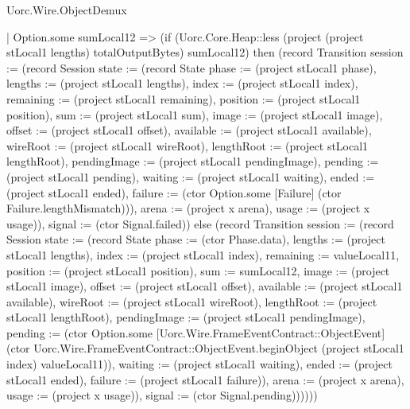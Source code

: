 \begin{lexlean}{Uorc.Wire.ObjectDemux}
\begin{semanticmodule}
{            | Option.some sumLocal12 => (if (Uorc.Core.Heap::less (project (project stLocal1 lengths) totalOutputBytes) sumLocal12) then (record Transition {session := (record Session {state := (record State {phase := (project stLocal1 phase), lengths := (project stLocal1 lengths), index := (project stLocal1 index), remaining := (project stLocal1 remaining), position := (project stLocal1 position), sum := (project stLocal1 sum), image := (project stLocal1 image), offset := (project stLocal1 offset), available := (project stLocal1 available), wireRoot := (project stLocal1 wireRoot), lengthRoot := (project stLocal1 lengthRoot), pendingImage := (project stLocal1 pendingImage), pending := (project stLocal1 pending), waiting := (project stLocal1 waiting), ended := (project stLocal1 ended), failure := (ctor Option.some [Failure] (ctor Failure.lengthMismatch))}), arena := (project x arena), usage := (project x usage)}), signal := (ctor Signal.failed)}) else (record Transition {session := (record Session {state := (record State {phase := (ctor Phase.data), lengths := (project stLocal1 lengths), index := (project stLocal1 index), remaining := valueLocal11, position := (project stLocal1 position), sum := sumLocal12, image := (project stLocal1 image), offset := (project stLocal1 offset), available := (project stLocal1 available), wireRoot := (project stLocal1 wireRoot), lengthRoot := (project stLocal1 lengthRoot), pendingImage := (project stLocal1 pendingImage), pending := (ctor Option.some [Uorc.Wire.FrameEventContract::ObjectEvent] (ctor Uorc.Wire.FrameEventContract::ObjectEvent.beginObject (project stLocal1 index) valueLocal11)), waiting := (project stLocal1 waiting), ended := (project stLocal1 ended), failure := (project stLocal1 failure)}), arena := (project x arena), usage := (project x usage)}), signal := (ctor Signal.pending)})))))
}
\end{semanticmodule}
\end{lexlean}
